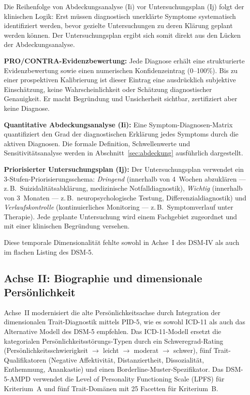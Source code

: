 \documentclass[11pt,a4paper]{article}
\begin{document}
Die Reihenfolge von Abdeckungsanalyse (Ii) vor Untersuchungsplan (Ij) folgt der klinischen Logik: Erst m\"ussen diagnostisch unerkl\"arte Symptome systematisch identifiziert werden, bevor gezielte Untersuchungen zu deren Kl\"arung geplant werden k\"onnen. Der Untersuchungsplan ergibt sich somit direkt aus den L\"ucken der Abdeckungsanalyse.

\textbf{PRO/CONTRA-Evidenzbewertung:} Jede Diagnose erh\"alt eine strukturierte Evidenzbewertung sowie einen numerischen Konfidenzeintrag (0--100\%). Bis zu einer prospektiven Kalibrierung ist dieser Eintrag eine ausdr\"ucklich subjektive Einsch\"atzung, keine Wahrscheinlichkeit oder Sch\"atzung diagnostischer Genauigkeit. Er macht Begr\"undung und Unsicherheit sichtbar, zertifiziert aber keine Diagnose.

\textbf{Quantitative Abdeckungsanalyse (Ii):} Eine Symptom-Diagnosen-Matrix quantifiziert den Grad der diagnostischen Erkl\"arung jedes Symptoms durch die aktiven Diagnosen. Die formale Definition, Schwellenwerte und Sensitivit\"atsanalyse werden in Abschnitt~\ref{sec:abdeckung} ausf\"uhrlich dargestellt.

\textbf{Priorisierter Untersuchungsplan (Ij):} Der Untersuchungsplan verwendet ein 3-Stufen-Priorisierungsschema: \textit{Dringend} (innerhalb von 4~Wochen abzukl\"aren --- z.\,B.\ Suizidalit\"atsabkl\"arung, medizinische Notfalldiagnostik), \textit{Wichtig} (innerhalb von 3~Monaten --- z.\,B.\ neuropsychologische Testung, Differenzialdiagnostik) und \textit{Verlaufskontrolle} (kontinuierliches Monitoring --- z.\,B.\ Symptomverlauf unter Therapie). Jede geplante Untersuchung wird einem Fachgebiet zugeordnet und mit einer klinischen Begr\"undung versehen.

Diese temporale Dimensionalit\"at fehlte sowohl in Achse~I des DSM-IV als auch im flachen Listing des DSM-5.

\subsection{Achse II: Biographie und dimensionale Pers\"onlichkeit}

Achse~II modernisiert die alte Pers\"onlichkeitsachse durch Integration der dimensionalen Trait-Diagnostik mittels PID-5, wie es sowohl ICD-11 als auch das Alternative Modell des DSM-5 empfehlen. Das ICD-11-Modell ersetzt die kategorialen Pers\"onlichkeitsst\"orungs-Typen durch ein Schweregrad-Rating (Pers\"onlichkeitsschwierigkeit $\to$ leicht $\to$ moderat $\to$ schwer), f\"unf Trait-Qualifikatoren (Negative Affektivit\"at, Distanziertheit, Dissozialit\"at, Enthemmung, Anankastie) und einen Borderline-Muster-Spezifikator. Das DSM-5-AMPD verwendet die Level of Personality Functioning Scale (LPFS) f\"ur Kriterium~A und f\"unf Trait-Dom\"anen mit 25 Facetten f\"ur Kriterium~B.
\end{document}
